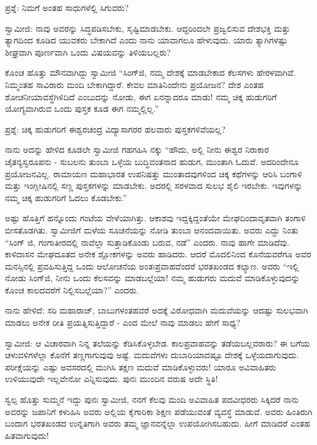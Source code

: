 ಪ್ರಶ್ನೆ: ನಿಮಗೆ ಅಂತಹ ಸಾಧುಗಳೆಲ್ಲಿ ಸಿಗುವರು?

ಸ್ವಾಮೀಜಿ: ನಾವು ಅವರನ್ನು ಸಿದ್ಧಪಡಿಸಬೇಕು, ಸೃಷ್ಟಿಮಾಡಬೇಕು. ಆದ್ದರಿಂದಲೇ ಪ್ರಜ್ವಲಿಸುವ ದೇಶಭಕ್ತಿ ಮತ್ತು ತ್ಯಾಗದಿಂದ ಕೂಡಿದ ಯುವಕರು ಬೇಕಾಗಿದೆ ಎಂದು ನಾನು ಯಾವಾಗಲೂ ಹೇಳುವುದು. ಯಾರು ತ್ಯಾಗಿಗಳಷ್ಟು ಶೀಘ್ರವಾಗಿ ಪೂರ್ಣವಾಗಿ ಒಂದು ವಿಷಯವನ್ನು ತಿಳಿಯಬಲ್ಲರು?

ಕೊಂಚ ಹೊತ್ತು ಮೌನವಾಗಿದ್ದು ಸ್ವಾಮೀಜಿ “ಸಿಂಗ್‌ಜಿ, ನಮ್ಮ ದೇಶಕ್ಕೆ ಮಾಡಬೇಕಾದ ಕೆಲಸಗಳು ಹೇರಳವಾಗಿವೆ. ನಿಮ್ಮಂತಹ ಸಾವಿರಾರು ಮಂದಿ ಬೇಕಾಗಿದ್ದಾರೆ. ಕೇವಲ ಮಾತಿನಿಂದೇನು ಪ್ರಯೋಜನ? ದೇಶ ಎಂತಹ ಶೋಚನೀಯಾವಸ್ಥೆಗಿಳಿದಿದೆ ಎಂಬುದನ್ನು ನೋಡು, ಈಗ ಏನನ್ನಾದರೂ ಮಾಡು! ನಮ್ಮ ಚಿಕ್ಕ ಹುಡುಗರಿಗೆ ಯೋಗ್ಯವಾಗಿರುವ ಒಂದು ಪುಸ್ತಕ ಕೂಡ ಈಗ ನಮ್ಮಲ್ಲಿಲ್ಲ.”

ಪ್ರಶ್ನೆ: ಚಿಕ್ಕ ಹುಡುಗರಿಗೆ ಈಶ್ವರಚಂದ್ರ ವಿದ್ಯಾಸಾಗರರ ಹಲವಾರು ಪುಸ್ತಕಗಳಿವೆಯಲ್ಲ?

ನಾನು ಅದನ್ನು ಹೇಳಿದ ಕೂಡಲೇ ಸ್ವಾಮೀಜಿ ಗಹಗಹಿಸಿ ನಕ್ಕು “ಹೌದು, ಅಲ್ಲಿ ನೀನು ಈಶ್ವರ ನಿರಾಕಾರ ಚೈತನ್ಯಸ್ವರೂಪನು - ಸುಬಲನು ತುಂಬಾ ಒಳ್ಳೆಯ ಬುದ್ಧಿವಂತನಾದ ಹುಡುಗ, ಮುಂತಾಗಿ ಓದುವೆ. ಅದರಿಂದೇನೂ ಪ್ರಯೋಜನವಿಲ್ಲ. ರಾಮಾಯಣ ಮಹಾಭಾರತ ಉಪನಿಷತ್ತು ಮುಂತಾದವುಗಳಿಂದ ಚಿಕ್ಕ ಕಥೆಗಳನ್ನು ಆರಿಸಿ ಬಂಗಾಳಿ ಮತ್ತು ಇಂಗ್ಲೀಷಿನಲ್ಲಿ ಸಣ್ಣ ಪುಸ್ತಕಗಳನ್ನು ಮಾಡಬೇಕು. ಅದರಲ್ಲಿ ಸರಳವಾದ ಸುಲಭ ಶೈಲಿ ಇರಬೇಕು. ಇವುಗಳನ್ನು ನಮ್ಮ ಚಿಕ್ಕ ಹುಡುಗರಿಗೆ ಓದಲು ಕೊಡಬೇಕು.”

ಅಷ್ಟು ಹೊತ್ತಿಗೆ ಹನ್ನೊಂದು ಗಂಟೆಯ ವೇಳೆಯಾಗಿತ್ತು. ಆಕಾಶವು ಇದ್ದಕ್ಕಿದ್ದಂತೆಯೇ ಮೇಘದಿಂದಾವೃತವಾಗಿ ತಂಗಾಳಿ ಬೀಸತೊಡಗಿತು. ಸ್ವಾಮೀಜಿಗೆ ಮಳೆಯ ಸೂಚನೆಯನ್ನು ನೋಡಿ ತುಂಬಾ ಆನಂದವಾಯಿತು. ಅವರು ಎದ್ದು ನಿಂತು “ಸಿಂಗ್ ಜಿ, ಗಂಗಾತೀರದಲ್ಲಿ ನಾವೆಲ್ಲಾ ಸುತ್ತಾಡಿಕೊಂಡು ಬರುವ, ನಡೆ” ಎಂದರು. ನಾವು ಹಾಗೇ ಮಾಡಿದೆವು. ಕಾಳಿದಾಸನ ಮೇಘದೂತದ ಅನೇಕ ಶ್ಲೋಕಗಳನ್ನು ಅವರು ಹಾಡಿದರು. ಆದರೆ ಮೊದಲಿನಿಂದ ಕೊನೆಯವರೆಗೂ ಅವರ ಮನಸ್ಸಿನಲ್ಲಿ ಪ್ರವಹಿಸುತ್ತಿದ್ದ ಒಂದು ಆಲೋಚನೆಯ ಅಂತಃಪ್ರವಾಹವೆಂದರೆ ಭರತಖಂಡದ ಕಲ್ಯಾಣ. ಅವರು “ಇಲ್ಲಿ ನೋಡು ಸಿಂಗ್‌ಜಿ, ನೀನು ಒಂದು ಕೆಲಸವನ್ನು ಮಾಡಬಲ್ಲೆಯಾ! ನಮ್ಮ ಹುಡುಗರು ಮದುವೆ ಮಾಡಿಕೊಳ್ಳುವುದನ್ನು ಕೊಂಚ ಕಾಲದವರೆಗೆ ನಿಲ್ಲಿಸಬಲ್ಲೆಯಾ?” ಎಂದರು.

ನಾನು ಹೇಳಿದೆ: ಸರಿ ಮಹಾರಾಜ್, ಬಾಬುಗಳಂತಹವರೆ ಅದಕ್ಕೆ ವಿರೋಧವಾಗಿ ಮದುವೆಯನ್ನು ಆದಷ್ಟು ಸುಲಭವಾಗಿ ಮಾಡಲು ಅನೇಕ ರೀತಿ ಪ್ರಯತ್ನಿಸುತ್ತಿದ್ದಾರೆ - ಎಂದ ಮೇಲೆ ನಾವು ಮಾಡಲು ಹೇಗೆ ಸಾಧ್ಯ?

ಸ್ವಾಮೀಜಿ: ಆ ವಿಚಾರವಾಗಿ ನಿನ್ನ ತಲೆಯನ್ನು ಕೆಡಿಸಿಕೊಳ್ಳಬೇಡ. ಕಾಲಪ್ರವಾಹವನ್ನು ತಡೆಯಬಲ್ಲವರಾರು? ಈ ಬಗೆಯ ಚಳುವಳಿಗಳೆಲ್ಲಾ ಕೊನೆಗೆ ತಣ್ಣಗಾಗುವುವು ಅಷ್ಟೆ. ಮದುವೆಗಳು ದುಬಾರಿಯಾದಷ್ಟೂ ದೇಶಕ್ಕೆ ಒಳ್ಳೆಯದಾಗುವುದು. ಪರೀಕ್ಷೆಯನ್ನು ಎಷ್ಟು ಅವಸರದಲ್ಲಿ ಮುಗಿಸಿ ತಕ್ಷಣ ಮದುವೆ ಮಾಡಿಕೊಳ್ಳುವರು! ಯಾರೂ ಅವಿವಾಹಿತರು ಉಳಿಯುವುದೇ ಇಲ್ಲವೇನೋ ಎನ್ನಿಸುವುದು. ಪುನಃ ಮುಂದಿನ ವರುಷ ಅದೇ ಸ್ಥಿತಿ!

ಸ್ವಲ್ಪ ಹೊತ್ತು ಸುಮ್ಮನೆ ಇದ್ದು ಪುನಃ ಸ್ವಾಮೀಜಿ, ನನಗೆ ಕೆಲವು ಮಂದಿ ಅವಿವಾಹಿತ ಪದವೀಧರರು ಸಿಕ್ಕಿದರೆ ನಾನು ಅವರನ್ನು ಜಪಾನಿಗೆ ಕಳುಹಿಸಿ ಅವರು ಅಲ್ಲಿಯ ಕೈಗಾರಿಕಾ ಶಿಕ್ಷಣ ಪಡೆಯುವಂತೆ ವ್ಯವಸ್ಥೆ ಮಾಡುವೆ. ಅವರು ಹಿಂತಿರುಗಿ ಬಂದಾಗ ಭರತಖಂಡದ ಉನ್ನತಿಗಾಗಿ ಅವರು ತಮ್ಮ ಜ್ಞಾನವನ್ನೆಲ್ಲಾ ಉಪಯೋಗಿಸಬಹುದು. ಹೀಗೆ ಮಾಡಿದರೆ ಎಂತಹ ಹಿತವಾಗುವುದು!

